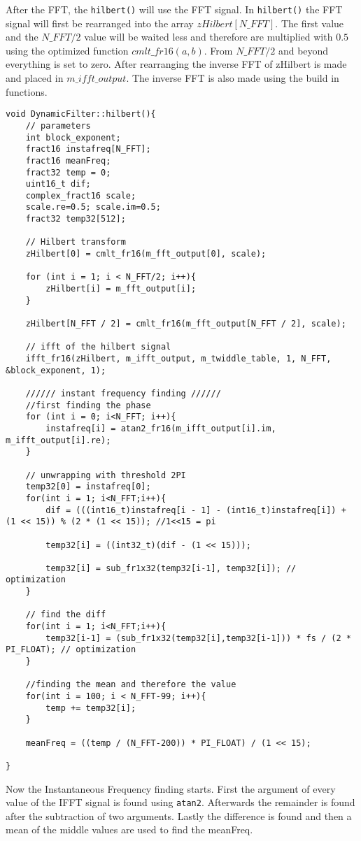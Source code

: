 After the FFT, the \texttt{hilbert()} will use the FFT signal. In \texttt{hilbert()} the FFT signal will first be rearranged into the array $zHilbert[N\_FFT]$.
The first value and the $N\_FFT/2$ value will be waited less and therefore are multiplied with $0.5$ using the optimized function $cmlt\_fr16(a,b)$.
From $N\_FFT/2$ and beyond everything is set to zero. 
After rearranging the inverse FFT of zHilbert is made and placed in $m\_ifft\_output$.
The inverse FFT is also made using the build in functions.
\begin{verbatim}
void DynamicFilter::hilbert(){
	// parameters
	int block_exponent;
	fract16 instafreq[N_FFT];
	fract16 meanFreq;
	fract32 temp = 0;
	uint16_t dif;
	complex_fract16 scale;
	scale.re=0.5; scale.im=0.5;
	fract32 temp32[512];
			
	// Hilbert transform
	zHilbert[0] = cmlt_fr16(m_fft_output[0], scale);
	
	for (int i = 1; i < N_FFT/2; i++){
		zHilbert[i] = m_fft_output[i];
	}
		
	zHilbert[N_FFT / 2] = cmlt_fr16(m_fft_output[N_FFT / 2], scale);
	
	// ifft of the hilbert signal
	ifft_fr16(zHilbert, m_ifft_output, m_twiddle_table, 1, N_FFT, &block_exponent, 1);
		
	////// instant frequency finding //////
	//first finding the phase
	for (int i = 0; i<N_FFT; i++){
		instafreq[i] = atan2_fr16(m_ifft_output[i].im, m_ifft_output[i].re);
	}
	
	// unwrapping with threshold 2PI
	temp32[0] = instafreq[0];
	for(int i = 1; i<N_FFT;i++){
		dif = (((int16_t)instafreq[i - 1] - (int16_t)instafreq[i]) + (1 << 15)) % (2 * (1 << 15)); //1<<15 = pi
		
		temp32[i] = ((int32_t)(dif - (1 << 15)));
			
		temp32[i] = sub_fr1x32(temp32[i-1],	temp32[i]); // optimization
	}
		
	// find the diff
	for(int i = 1; i<N_FFT;i++){
		temp32[i-1] = (sub_fr1x32(temp32[i],temp32[i-1])) * fs / (2 * PI_FLOAT); // optimization
	}
		
	//finding the mean and therefore the value
	for(int i = 100; i < N_FFT-99; i++){
		temp += temp32[i];
	}
		
	meanFreq = ((temp / (N_FFT-200)) * PI_FLOAT) / (1 << 15);
		
}
\end{verbatim}

Now the Instantaneous Frequency finding starts. First the argument of every value of the IFFT signal is found using \texttt{atan2}.
Afterwards the remainder is found after the subtraction of two arguments.
Lastly the difference is found and then a mean of the middle values are used to find the meanFreq.

